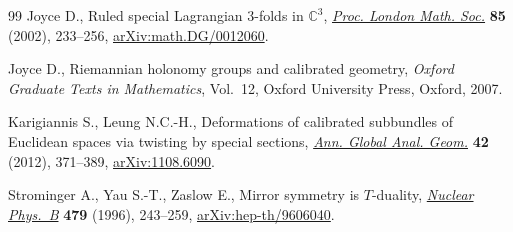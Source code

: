 \documentclass[pdftex]{sigma}
\numberwithin{equation}{section}
\begin{document}
\begin{thebibliography}{99}
Joyce D., Ruled special {L}agrangian 3-folds in {$\mathbb C^3$}, \href{https://doi.org/10.1112/S0024611502013485}{\textit{Proc.
 London Math. Soc.}} \textbf{85} (2002), 233--256, \href{https://arxiv.org/abs/math.DG/0012060}{arXiv:math.DG/0012060}.

Joyce D., Riemannian holonomy groups and calibrated geometry, \textit{Oxford
 Graduate Texts in Mathematics}, Vol.~12, Oxford University Press, Oxford,
 2007.

Karigiannis S., Leung N.C.-H., Deformations of calibrated subbundles of
 {E}uclidean spaces via twisting by special sections, \href{https://doi.org/10.1007/s10455-012-9317-1}{\textit{Ann. Global
 Anal. Geom.}} \textbf{42} (2012), 371--389, \href{https://arxiv.org/abs/1108.6090}{arXiv:1108.6090}.

Strominger A., Yau S.-T., Zaslow E., Mirror symmetry is {$T$}-duality,
 \href{https://doi.org/10.1016/0550-3213(96)00434-8}{\textit{Nuclear Phys.~B}} \textbf{479} (1996), 243--259,
 \href{https://arxiv.org/abs/hep-th/9606040}{arXiv:hep-th/9606040}.

\end{thebibliography}\LastPageEnding
\end{document}
